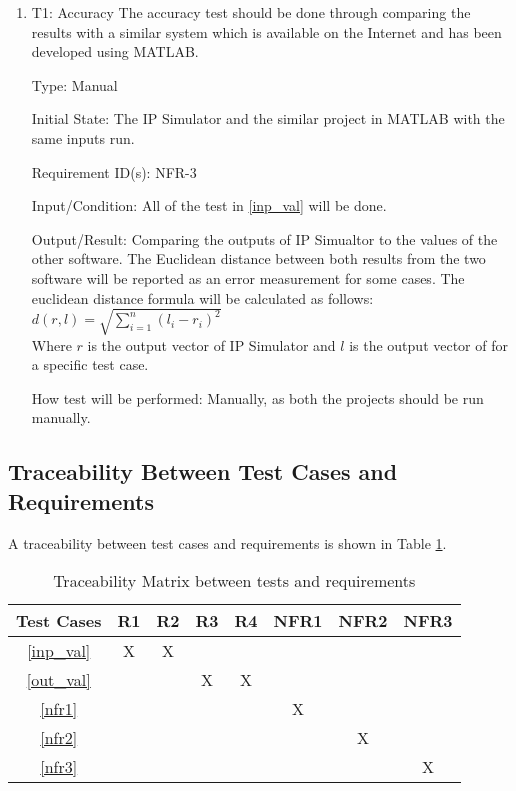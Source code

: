 \documentclass[12pt, titlepage]{article}
\begin{document}
\begin{enumerate}

\item{T1: Accuracy}
\vspace{3mm}
\newline
The accuracy test should be done through comparing the results with a similar system which is available on the Internet and has been developed using MATLAB. \cite{al-khazraji_2022} 

Type: Manual
					
Initial State: The IP Simulator and the similar project in MATLAB with the same inputs run.

Requirement ID(s): NFR-3			

Input/Condition: All of the test in \ref{inp_val} will be done.

Output/Result: Comparing the outputs of IP Simualtor to the values of the other software. The Euclidean distance between both results from the two software will be reported as an error measurement for some cases. The euclidean distance formula will be calculated as follows:\\
\newline
$d\left( r,l\right)   = \sqrt {\sum _{i=1}^{n}  \left( l_{i}-r_{i}\right)^2 } $ \\
\newline
Where $r$ is the output vector of IP Simulator and $l$ is the output vector of \cite{al-khazraji_2022} for a specific test case. 

How test will be performed: Manually, as both the projects should be run manually.

\end{enumerate}

\subsection{Traceability Between Test Cases and Requirements}
A traceability between test cases and requirements is shown in Table \ref{tbl_rel}.


\begin{table} [h!]
\caption{Traceability Matrix between tests and requirements}\label{tbl_rel}
\vspace*{3mm}
\centering
\begin{tabular}{|c|c| c| c| c | c|c | c|}
\hline
Test Cases & R1 & R2 & R3& R4& NFR1& NFR2&NFR3  \\
 \hline   
 \ref{inp_val} &X &X & & &&& \\
 \hline
  \ref{out_val}   & & & X&X & && \\
 \hline
  \ref{nfr1}   && & & &  X&&\\
 \hline
  \ref{nfr2}  &&& & &  &X&\\
 \hline
  \ref{nfr3}  &&& & &  &&X\\
 \hline
\end{tabular}

\end{table}
\end{document}
